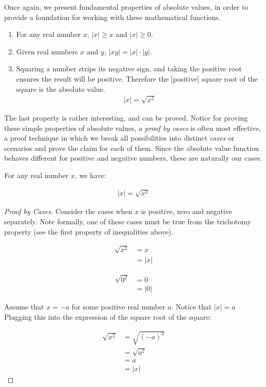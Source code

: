 Once again, we present fundamental properties of absolute values, in order to provide a foundation for working with these mathematical functions.

\begin{enumerate}
	\item For any real number $x$, $|x| \ge x$ and $|x| \ge 0$.
	\item Given real numbers $x$ and $y$, $|xy| = |x| \cdot |y|$.
	\item Squaring a number strips its negative sign, and taking the positive root ensures the result will be positive. Therefore the [positive] square root of the square is the absolute value.
	\begin{align*}
		|x| = \sqrt{x^2}
	\end{align*}
\end{enumerate}

The last property is rather interesting, and can be proved. Notice for proving these simple properties of absolute values, a \emph{proof by cases} is often most effective, a proof technique in which we break all possibilities into distinct \emph{cases} or scenarios and prove the claim for each of them. Since the absolute value function behaves different for positive and negative numbers, these are naturally our cases.

\vspace{\baselineskip}
\begin{theorem}
	For any real number $x$, we have:
	
	\begin{align}
		|x| = \sqrt{x^2}
	\end{align}
\end{theorem}

\begin{proof}[Proof by Cases]
	Consider the cases when $x$ is positive, zero and negative separately. Note formally, one of these cases must be true from the trichotomy property (see the first property of inequalities above).
	
	
	\begin{align*}
		\sqrt{x^2} &= x \\
		&= |x|
	\end{align*}
	
	
	\begin{align*}
		\sqrt{0^2} &= 0 \\
		&= |0|
	\end{align*}
	
	Assume that $x = -a$ for some positive real number $a$. Notice that $|x| = a$ Plugging this into the expression of the square root of the square:
	
	\begin{align*}
		\sqrt{x^2} &= \sqrt{(-a)^2} \\
		&= \sqrt{a^2} \\
		&= a \\
		&= |x|
	\end{align*}
\end{proof}


